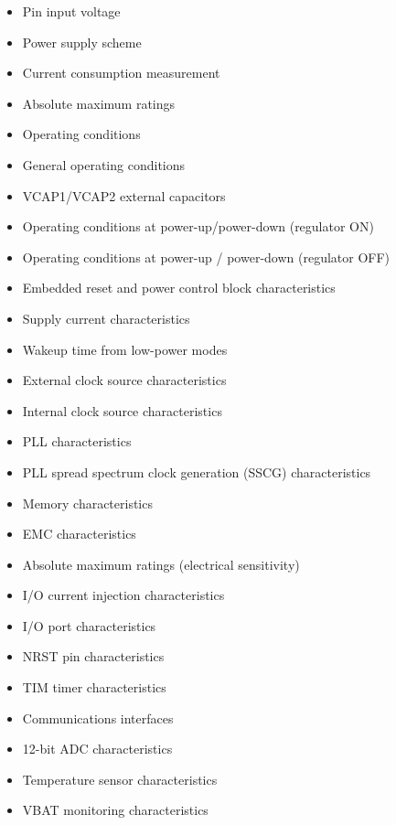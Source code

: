 \documentclass{article}
\begin{document}
\begin{itemize}
\begin{itemize}
        \item Pin input voltage 
        \item Power supply scheme 
        \item Current consumption measurement 
        \item Absolute maximum ratings 
        \item Operating conditions 
        \item General operating conditions 
        \item VCAP1/VCAP2 external capacitors 
        \item Operating conditions at power-up/power-down (regulator ON) 
        \item Operating conditions at power-up / power-down (regulator OFF) 
        \item Embedded reset and power control block characteristics 
        \item Supply current characteristics 
        \item Wakeup time from low-power modes 
        \item External clock source characteristics 
        \item Internal clock source characteristics 
        \item PLL characteristics 
        \item PLL spread spectrum clock generation (SSCG) characteristics 
        \item Memory characteristics 
        \item EMC characteristics 
        \item Absolute maximum ratings (electrical sensitivity) 
        \item I/O current injection characteristics 
        \item I/O port characteristics 
        \item NRST pin characteristics 
        \item TIM timer characteristics 
        \item Communications interfaces 
        \item 12-bit ADC characteristics 
        \item Temperature sensor characteristics 
        \item VBAT monitoring characteristics 

\end{itemize}
\end{itemize}
\end{document}
